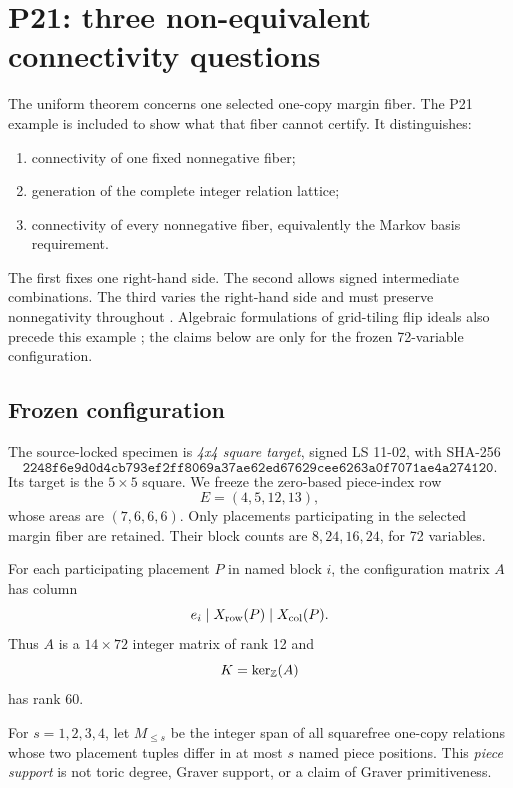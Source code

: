 \section{P21: three non-equivalent connectivity questions}\label{sec:p21}

The uniform theorem concerns one selected one-copy margin fiber.  The P21
example is included to show what that fiber cannot certify.  It distinguishes:
\begin{enumerate}
  \item connectivity of one fixed nonnegative fiber;
  \item generation of the complete integer relation lattice;
  \item connectivity of every nonnegative fiber, equivalently the Markov
        basis requirement.
\end{enumerate}
The first fixes one right-hand side.  The second allows signed intermediate
combinations.  The third varies the right-hand side and must preserve
nonnegativity throughout \cite{DiaconisSturmfels1998}.  Algebraic
formulations of grid-tiling flip ideals also precede this example
\cite{Chin2019,GrossYamzon2021}; the claims below are only for the frozen
72-variable configuration.

\subsection{Frozen configuration}

The source-locked specimen is \emph{4x4 square target}, signed LS 11-02, with
SHA-256
\[
\mathtt{2248f6e9d0d4cb793ef2ff8069a37ae62ed67629cee6263a0f7071ae4a274120}.
\]
Its target is the \(5\times5\) square.  We freeze the zero-based piece-index
row
\[
 E=(4,5,12,13),
\]
whose areas are \((7,6,6,6)\).  Only placements participating in the selected
margin fiber are retained.  Their block counts are \(8,24,16,24\), for 72
variables.

For each participating placement \(P\) in named block \(i\), the
configuration matrix \(A\) has column
\[
 e_i\mid X_{\rm row}(P)\mid X_{\rm col}(P).
\]
Thus \(A\) is a \(14\times72\) integer matrix of rank 12 and
\[
 K=\ker_{\mathbb Z}(A)
\]
has rank 60.

For \(s=1,2,3,4\), let \(M_{\leq s}\) be the integer span of all squarefree
one-copy relations whose two placement tuples differ in at most \(s\) named
piece positions.  This \emph{piece support} is not toric degree, Graver
support, or a claim of Graver primitiveness.

